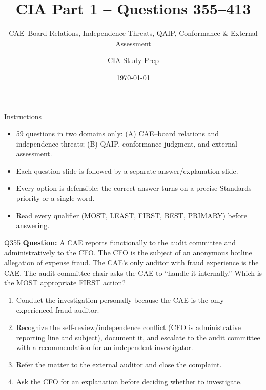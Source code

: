 \documentclass[aspectratio=169,10pt]{beamer}
\title{CIA Part 1 -- Questions 355--413}
\subtitle{CAE--Board Relations, Independence Threats, QAIP, Conformance \& External Assessment}
\author{CIA Study Prep}
\date{\today}
\begin{document}
	
	\begin{frame}
		\titlepage
	\end{frame}
	
	\begin{frame}{Instructions}
		\begin{itemize}
			\item 59 questions in two domains only: (A) CAE--board relations and independence threats; (B) QAIP, conformance judgment, and external assessment.
			\item Each question slide is followed by a separate answer/explanation slide.
			\item Every option is defensible; the correct answer turns on a precise Standards priority or a single word.
			\item Read every qualifier (MOST, LEAST, FIRST, BEST, PRIMARY) before answering.
		\end{itemize}
	\end{frame}
	
	
	\begin{frame}[t]{Q355}
		\small
		\textbf{Question:} A CAE reports functionally to the audit committee and administratively to the CFO. The CFO is the subject of an anonymous hotline allegation of expense fraud. The CAE's only auditor with fraud experience is the CAE. The audit committee chair asks the CAE to ``handle it internally.'' Which is the MOST appropriate FIRST action?
		\begin{enumerate}[label=\Alph*.,itemsep=1pt,topsep=2pt]
			\item Conduct the investigation personally because the CAE is the only experienced fraud auditor.
			\item Recognize the self-review/independence conflict (CFO is administrative reporting line and subject), document it, and escalate to the audit committee with a recommendation for an independent investigator.
			\item Refer the matter to the external auditor and close the complaint.
			\item Ask the CFO for an explanation before deciding whether to investigate.
		\end{enumerate}
	\end{frame}
	
\end{document}
